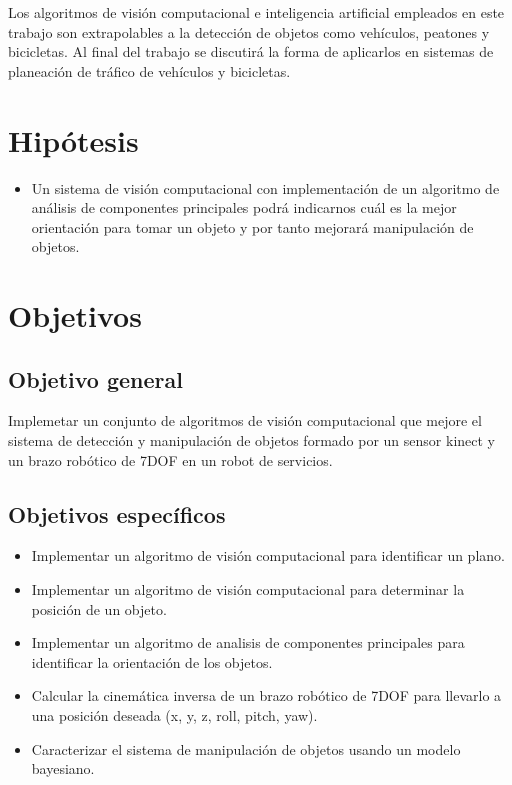 \documentclass[a4paper, openright, 12pt]{report}
\begin{document}
		Los algoritmos de visión computacional e inteligencia artificial empleados en este trabajo son extrapolables a la detección de objetos como vehículos, peatones y bicicletas. Al final del trabajo se discutirá la forma de aplicarlos en sistemas de planeación de tráfico de vehículos y bicicletas.\\



	\section{Hipótesis}
		\begin{itemize}

			\item Un sistema de visión computacional con implementación de un algoritmo de análisis de componentes principales podrá indicarnos cuál es la mejor orientación para tomar un objeto y por tanto mejorará manipulación de objetos.\\

		\end{itemize}

	\section{Objetivos}
		\subsection*{Objetivo general}
			Implemetar un conjunto de algoritmos de visión computacional que mejore el sistema de detección y manipulación de objetos formado por un sensor kinect y un brazo robótico de 7DOF en un robot de servicios.
		\subsection*{Objetivos específicos}
			\begin{itemize}
				\item Implementar un algoritmo de visión computacional para identificar un plano.

				\item Implementar un algoritmo de visión computacional para determinar la posición de un objeto.

				\item Implementar un algoritmo de analisis de componentes principales para identificar la orientación de los objetos.

				\item Calcular la cinemática inversa de un brazo robótico de 7DOF para llevarlo a una posición deseada (x, y, z, roll, pitch, yaw).

				\item Caracterizar el sistema de manipulación de objetos usando un modelo bayesiano.

			\end{itemize}
\end{document}
